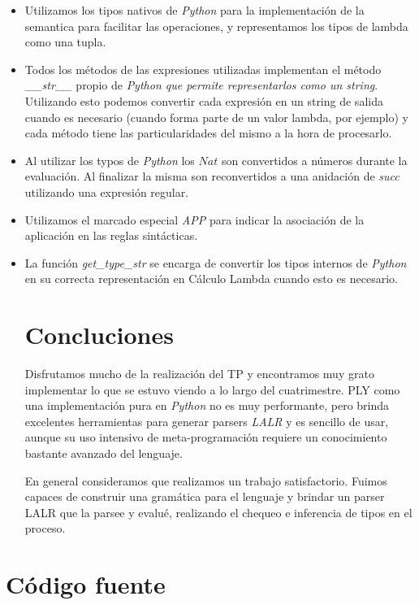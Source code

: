 \documentclass{article}
\theoremstyle{definition}
\theoremstyle{remark}
\begin{document}
\begin{itemize}
	\item Utilizamos los tipos nativos de \emph{Python} para la implementación de la semantica para facilitar las operaciones, y representamos los tipos de lambda como una tupla.
	
	\item Todos los métodos de las expresiones utilizadas implementan el método \emph{\_\_str\_\_} propio de \emph{Python que permite representarlos como un string}. Utilizando esto podemos convertir cada expresión en un string de salida cuando es necesario (cuando forma parte de un valor lambda, por ejemplo) y cada método tiene las particularidades del mismo a la hora de procesarlo.
	
	\item Al utilizar los typos de \emph{Python} los $Nat$ son convertidos a números durante la evaluación. Al finalizar la misma son reconvertidos a una anidación de \emph{succ} utilizando una expresión regular.
	
	\item Utilizamos el marcado especial \emph{APP} para indicar la asociación de la aplicación en las reglas sintácticas.
	
	\item La función \emph{get\_type\_str} se encarga de convertir los tipos internos de \emph{Python} en su correcta representación en Cálculo Lambda cuando esto es necesario.
	
\section{Concluciones}

	Disfrutamos mucho de la realización del TP y encontramos muy grato implementar lo que se estuvo viendo a lo largo del cuatrimestre. PLY como una implementación pura en \emph{Python} no es muy performante, pero brinda excelentes herramientas para generar parsers \emph{LALR} y es sencillo de usar, aunque su uso intensivo de meta-programación requiere un conocimiento bastante avanzado del lenguaje.
	
	En general consideramos que realizamos un trabajo satisfactorio. Fuimos capaces de construir una gramática para el lenguaje y brindar un parser LALR que la parsee y evalué, realizando el chequeo e inferencia de tipos en el proceso.
\end{itemize}

\newpage
\section{Código fuente}\label{codigo}
\end{document}
